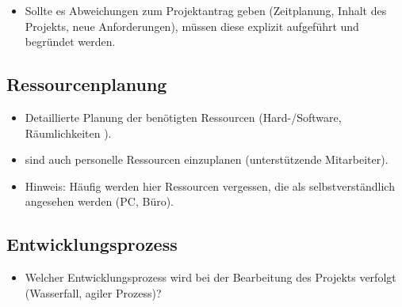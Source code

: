 \begin{itemize}
	\item Sollte es Abweichungen zum Projektantrag geben (\zB Zeitplanung, Inhalt des Projekts, neue Anforderungen), müssen diese explizit aufgeführt und begründet werden.
\end{itemize}


\subsection{Ressourcenplanung}
\label{sec:Ressourcenplanung}

\begin{itemize}
	\item Detaillierte Planung der benötigten Ressourcen (Hard-/Software, Räumlichkeiten \usw).
	\item \Ggfs sind auch personelle Ressourcen einzuplanen (\zB unterstützende Mitarbeiter).
	\item Hinweis: Häufig werden hier Ressourcen vergessen, die als selbstverständlich angesehen werden (\zB PC, Büro).
\end{itemize}


\subsection{Entwicklungsprozess}
\label{sec:Entwicklungsprozess}
\begin{itemize}
	\item Welcher Entwicklungsprozess wird bei der Bearbeitung des Projekts verfolgt (\zB Wasserfall, agiler Prozess)?
\end{itemize}